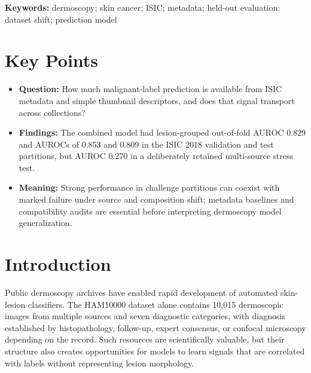 \documentclass[11pt]{article}
\begin{document}
\begin{abstract}
\noindent\textbf{Conclusions and Relevance:} Metadata and low-complexity thumbnail descriptors contain substantial predictive signal in open dermoscopy data. Good performance in two challenge partitions from one attribution source did not imply transportability to a multi-source balanced collection. Metadata-only benchmarks, overlap checks, label harmonization, and deliberately adverse stress tests should accompany claims about dermoscopy model generalization.
\end{abstract}

\noindent\textbf{Keywords:} dermoscopy; skin cancer; ISIC; metadata; held-out evaluation; dataset shift; prediction model

\section*{Key Points}
\begin{itemize}[leftmargin=1.5em]
\item \textbf{Question:} How much malignant-label prediction is available from ISIC metadata and simple thumbnail descriptors, and does that signal transport across collections?
\item \textbf{Findings:} The combined model had lesion-grouped out-of-fold AUROC 0.829 and AUROCs of 0.853 and 0.809 in the ISIC 2018 validation and test partitions, but AUROC 0.270 in a deliberately retained multi-source stress test.
\item \textbf{Meaning:} Strong performance in challenge partitions can coexist with marked failure under source and composition shift; metadata baselines and compatibility audits are essential before interpreting dermoscopy model generalization.
\end{itemize}

\section{Introduction}
Public dermoscopy archives have enabled rapid development of automated skin-lesion classifiers. The HAM10000 dataset alone contains 10,015 dermoscopic images from multiple sources and seven diagnostic categories, with diagnosis established by histopathology, follow-up, expert consensus, or confocal microscopy depending on the record.\cite{tschandl2018} Such resources are scientifically valuable, but their structure also creates opportunities for models to learn signals that are correlated with labels without representing lesion morphology.
\end{document}
